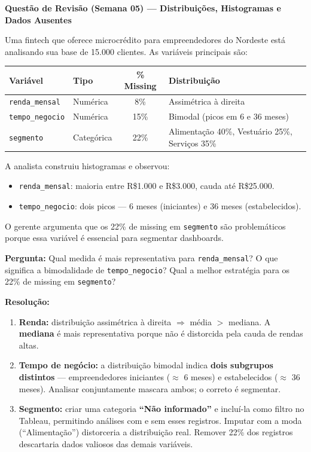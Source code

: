 \begin{SolvedBox}
\textbf{Questão de Revisão (Semana 05) — Distribuições, Histogramas e Dados Ausentes}

Uma fintech que oferece microcrédito para empreendedores do Nordeste está
analisando sua base de 15.000 clientes. As variáveis principais são:

\begin{center}
\begin{tabular}{|l|l|c|l|}
\hline
\textbf{Variável} & \textbf{Tipo} & \textbf{\% Missing} & \textbf{Distribuição} \\
\hline
\texttt{renda\_mensal}       & Numérica    & 8\%  & Assimétrica à direita \\
\texttt{tempo\_negocio}      & Numérica    & 15\% & Bimodal (picos em 6 e 36 meses) \\
\texttt{segmento}            & Categórica  & 22\% & Alimentação 40\%, Vestuário 25\%, Serviços 35\% \\
\hline
\end{tabular}
\end{center}

A analista construiu histogramas e observou:
\begin{itemize}
  \item \texttt{renda\_mensal}: maioria entre R\$1.000 e R\$3.000, cauda até R\$25.000.
  \item \texttt{tempo\_negocio}: dois picos — 6 meses (iniciantes) e 36 meses (estabelecidos).
\end{itemize}

O gerente argumenta que os 22\% de missing em \texttt{segmento} são problemáticos
porque essa variável é essencial para segmentar dashboards.

\textbf{Pergunta:} Qual medida é mais representativa para \texttt{renda\_mensal}?
O que significa a bimodalidade de \texttt{tempo\_negocio}? Qual a melhor
estratégia para os 22\% de missing em \texttt{segmento}?

\medskip
\textbf{Resolução:}

\begin{enumerate}
  \item \textbf{Renda:} distribuição assimétrica à direita $\Rightarrow$ média $>$ mediana.
  A \textbf{mediana} é mais representativa porque não é distorcida pela cauda de rendas altas.

  \item \textbf{Tempo de negócio:} a distribuição bimodal indica \textbf{dois subgrupos distintos}
  — empreendedores iniciantes ($\approx$ 6 meses) e estabelecidos ($\approx$ 36 meses).
  Analisar conjuntamente mascara ambos; o correto é segmentar.

  \item \textbf{Segmento:} criar uma categoria \textbf{``Não informado''} e incluí-la
  como filtro no Tableau, permitindo análises com e sem esses registros.
  Imputar com a moda (``Alimentação'') distorceria a distribuição real.
  Remover 22\% dos registros descartaria dados valiosos das demais variáveis.
\end{enumerate}
\end{SolvedBox}

